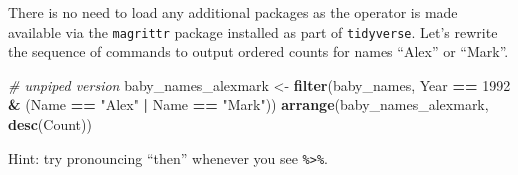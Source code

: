 \documentclass[]{book}
\newenvironment{Shaded}{\begin{snugshade}}{\end{snugshade}}
\newcommand{\KeywordTok}[1]{\textcolor[rgb]{0.13,0.29,0.53}{\textbf{#1}}}
\newcommand{\DecValTok}[1]{\textcolor[rgb]{0.00,0.00,0.81}{#1}}
\newcommand{\StringTok}[1]{\textcolor[rgb]{0.31,0.60,0.02}{#1}}
\newcommand{\CommentTok}[1]{\textcolor[rgb]{0.56,0.35,0.01}{\textit{#1}}}
\newcommand{\OperatorTok}[1]{\textcolor[rgb]{0.81,0.36,0.00}{\textbf{#1}}}
\newcommand{\NormalTok}[1]{#1}
\begin{document}
There is no need to load any additional packages as the operator is made
available via the \texttt{magrittr} package installed as part of
\texttt{tidyverse}. Let's rewrite the sequence of commands to output
ordered counts for names ``Alex'' or ``Mark''.

\begin{Shaded}
\begin{Highlighting}[]
\CommentTok{# unpiped version}
\NormalTok{baby_names_alexmark <-}\StringTok{ }\KeywordTok{filter}\NormalTok{(baby_names, Year }\OperatorTok{==}\StringTok{ }\DecValTok{1992} \OperatorTok{&}\StringTok{ }\NormalTok{(Name }\OperatorTok{==}\StringTok{ "Alex"} \OperatorTok{|}\StringTok{ }\NormalTok{Name }\OperatorTok{==}\StringTok{ "Mark"}\NormalTok{))}
\KeywordTok{arrange}\NormalTok{(baby_names_alexmark, }\KeywordTok{desc}\NormalTok{(Count))}
\end{Highlighting}
\end{Shaded}

\begin{Shaded}
\end{Shaded}

Hint: try pronouncing ``then'' whenever you see
\texttt{\%\textgreater{}\%}.

\begin{Shaded}
\end{Shaded}
\end{document}

